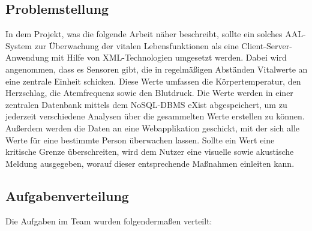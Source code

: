 \subsection{Problemstellung}
In dem Projekt, was die folgende Arbeit näher beschreibt, sollte ein solches AAL-System zur Überwachung der vitalen Lebensfunktionen als eine Client-Server-Anwendung mit Hilfe von XML-Technologien umgesetzt werden. Dabei wird angenommen, dass es Sensoren gibt, die in regelmäßigen Abständen Vitalwerte an eine zentrale Einheit schicken. Diese Werte umfassen die Körpertemperatur, den Herzschlag, die Atemfrequenz sowie den Blutdruck. Die Werte werden in einer zentralen Datenbank mittels dem NoSQL-DBMS eXist abgespeichert, um zu jederzeit verschiedene Analysen über die gesammelten Werte erstellen zu können. Außerdem werden die Daten an eine Webapplikation geschickt, mit der sich alle Werte für eine bestimmte Person überwachen lassen. Sollte ein Wert eine kritische Grenze überschreiten, wird dem Nutzer eine visuelle sowie akustische Meldung ausgegeben, worauf dieser entsprechende Maßnahmen einleiten kann.

\newpage
\subsection{Aufgabenverteilung}
Die Aufgaben im Team wurden folgendermaßen verteilt:

